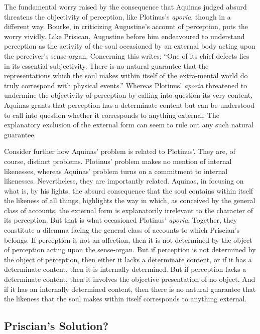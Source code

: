 \documentclass[12pt]{article}
\begin{document}
The fundamental worry raised by the consequence that Aquinas judged absurd threatens the objectivity of perception, like Plotinus's \emph{aporia}, though in a different way. Bourke, in criticizing Augustine's account of perception, puts the worry vividly. Like Prisican, Augustine before him endeavoured to understand perception as the activity of the soul occasioned by an external body acting upon the perceiver's sense-organ. Concerning this \citet[112]{Bourke:1947jk} writes: ``One of its chief defects lies in its essential subjectivity. There is no natural guarantee that the representations which the soul makes within itself of the extra-mental world do truly correspond with physical events.'' Whereas Plotinus' \emph{aporia} threatened to undermine the objectivity of perception by calling into question its very content, Aquinas grants that perception has a determinate content but can be understood to call into question whether it corresponds to anything external. The explanatory exclusion of the external form can seem to rule out any such natural guarantee.

Consider further how Aquinas' problem is related to Plotinus'. They are, of course, distinct problems. Plotinus' problem makes no mention of internal likenesses, whereas Aquinas' problem turns on a commitment to internal likenesses. Nevertheless, they are importantly related. Aquinas, in focusing on what is, by his lights, the absurd consequence that the soul contains within itself the likeness of all things, highlights the way in which, as conceived by the general class of accounts, the external form is explanatorily irrelevant to the character of its perception. But that is what occasioned Plotinus' \emph{aporia}. Together, they constitute a dilemma facing the general class of accounts to which Priscian's belongs. If perception is not an affection, then it is not determined by the object of perception acting upon the sense-organ. But if perception is not determined by the object of perception, then either it lacks a determinate content, or if it has a determinate content, then it is internally determined. But if perception lacks a determinate content, then it involves the objective presentation of no object. And if it has an internally determined content, then there is no natural guarantee that the likeness that the soul makes within itself corresponds to anything external.


\subsection{Priscian's Solution?} %
\label{sec:_ldots_and_priscian_s_solution}
\end{document}
